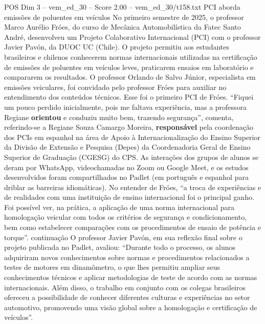 \begin{textsample}{POS Dim 3 – vem\_ed\_30 – Score 2.00 – vem\_ed\_30/t158.txt}  \label{ex:f3_pos_115}
PCI aborda emissões de poluentes em veículos No primeiro semestre de 2025, o professor Marco Aurélio Fróes, do curso de Mecânica Automobilística da Fatec Santo André, desenvolveu um Projeto Colaborativo Internacional (PCI) com o professor Javier Pavón, da DUOC UC (Chile).
O projeto permitiu aos estudantes brasileiros e chilenos conhecerem normas internacionais utilizadas na certificação de emissões de poluentes em veículos leves, praticarem ensaios em laboratório e compararem os resultados.
O professor Orlando de Salvo Júnior, especialista em emissões veiculares, foi convidado pelo professor Fróes para auxiliar no entendimento dos conteúdos técnicos.
Esse foi o primeiro PCI de Fróes. “Fiquei um pouco perdido inicialmente, pois me faltava experiência, mas a professora Regiane \textbf{orientou} e conduziu muito bem, trazendo segurança”, comenta, referindo-se a Regiane Souza Camargo Moreira, \textbf{responsável} pela coordenação dos PCIs em espanhol na área de Apoio à Internacionalização do Ensino Superior da Divisão de Extensão e Pesquisa (Depes) da Coordenadoria Geral de Ensino Superior de Graduação (CGESG) do CPS.
As interações dos grupos de alunos se deram por WhatsApp, videochamadas no Zoom ou Google Meet, e os estudos desenvolvidos foram compartilhados no Padlet (em português e espanhol para driblar as barreiras idiomáticas).
No entender de Fróes, “a troca de experiências e de realidades com uma instituição de ensino internacional foi o principal ganho.
Foi possível ver, na prática, a aplicação de uma norma internacional para homologação veicular com todos os critérios de segurança e condicionamento, bem como estabelecer comparações com os procedimentos de ensaio de potência e torque”. continuação O professor Javier Pavón, em sua reflexão final sobre o projeto publicada no Padlet, avaliou: “Durante todo o processo, os alunos adquiriram novos conhecimentos sobre normas e procedimentos relacionados a testes de motores em dinamômetro, o que lhes permitiu ampliar seus conhecimentos técnicos e aplicar metodologias de teste de acordo com as normas internacionais.
Além disso, o trabalho em conjunto com os colegas brasileiros ofereceu a possibilidade de conhecer diferentes culturas e experiências no setor automotivo, promovendo uma visão global sobre a homologação e certificação de veículos”.

\end{textsample}
